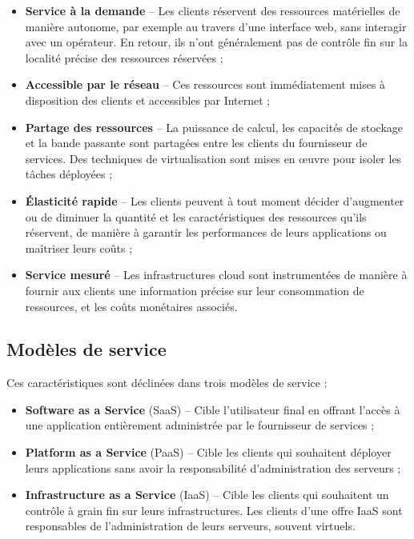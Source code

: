 \begin{itemize}
    \item \textbf{Service à la demande} -- Les clients réservent des ressources matérielles de manière autonome, par exemple au travers d'une interface web, sans interagir avec un opérateur. En retour, ils n'ont généralement pas de contrôle fin sur la localité précise des ressources réservées ;
    \item \textbf{Accessible par le réseau} -- Ces ressources sont immédiatement mises à disposition des clients et accessibles par Internet ;
    \item \textbf{Partage des ressources} -- La puissance de calcul, les capacités de stockage et la bande passante sont partagées entre les clients du fournisseur de services. Des techniques de virtualisation sont mises en œuvre pour isoler les tâches déployées ;
    \item \textbf{Élasticité rapide} -- Les clients peuvent à tout moment décider d'augmenter ou de diminuer la quantité et les caractéristiques des ressources qu'ils réservent, de manière à garantir les performances de leurs applications ou maîtriser leurs coûts ;
    \item \textbf{Service mesuré} -- Les infrastructures cloud sont instrumentées de manière à fournir aux clients une information précise sur leur consommation de ressources, et les coûts monétaires associés.
\end{itemize}

\subsection{Modèles de service}

Ces caractéristiques sont déclinées dans trois modèles de service :

\begin{itemize}
    \item \textbf{Software as a Service} (SaaS) -- Cible l'utilisateur final en offrant l'accès à une application entièrement administrée par le fournisseur de services ;
    \item \textbf{Platform as a Service} (PaaS) -- Cible les clients qui souhaitent déployer leurs applications sans avoir la responsabilité d'administration des serveurs ;
    \item \textbf{Infrastructure as a Service} (IaaS) -- Cible les clients qui souhaitent un contrôle à grain fin sur leurs infrastructures. Les clients d'une offre IaaS sont responsables de l'administration de leurs serveurs, souvent virtuels. 
\end{itemize}


